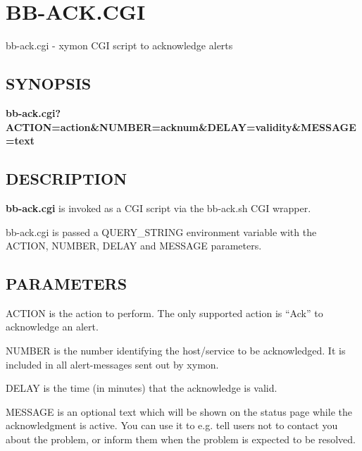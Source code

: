 \section{BB-ACK.CGI}
 bb-ack.cgi - xymon CGI script to acknowledge alerts \

\subsection{SYNOPSIS}
\textbf{bb-ack.cgi?ACTION=action\&NUMBER=acknum\&DELAY=validity\&MESSAGE=text}


 
\subsection{DESCRIPTION}
\textbf{bb-ack.cgi}
 is invoked as a CGI script via the bb-ack.sh CGI wrapper. 

  bb-ack.cgi is passed a QUERY\_STRING environment variable with the
  ACTION, NUMBER, DELAY and MESSAGE parameters. 



 
\subsection{PARAMETERS}
 ACTION is the action to perform. The only supported action is ``Ack'' to acknowledge an alert. 

  NUMBER is the number identifying the host/service to be
  acknowledged. It is included in all alert-messages sent out by
  xymon. 



  DELAY is the time (in minutes) that the acknowledge is valid. 


  MESSAGE is an optional text which will be shown on the status page
  while the acknowledgment is active. You can use it to e.g. tell
  users not to contact you about the problem, or inform them when the
  problem is expected to be resolved. 



 
